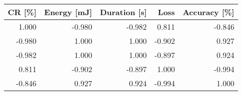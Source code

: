 \begin{tabular}{rrrrr}
\toprule
    CR [\%] & Energy [mJ] & Duration [s] &       Loss & Accuracy [\%] \\
\midrule
     1.000 &      -0.980 &       -0.982 &      0.811 &       -0.846 \\
    -0.980 &       1.000 &        1.000 &     -0.902 &        0.927 \\
    -0.982 &       1.000 &        1.000 &     -0.897 &        0.924 \\
     0.811 &      -0.902 &       -0.897 &      1.000 &       -0.994 \\
    -0.846 &       0.927 &        0.924 &     -0.994 &        1.000 \\
\bottomrule
\end{tabular}
